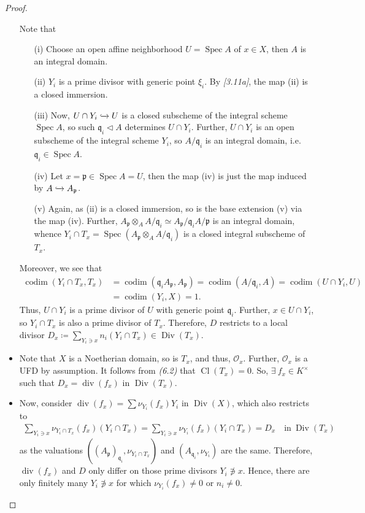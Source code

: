 \documentclass[11pt,a4paper,footinclude=true,headinclude=true]{scrbook} %
\DeclareMathOperator{\Spec}{Spec}
\DeclareMathOperator{\Div}{Div}
\DeclareMathOperator{\Cl}{Cl}
\DeclareMathOperator{\dv}{div}
\DeclareMathOperator{\codim}{codim}
\newcommand{\OO}{\mathcal{O}}
\newcommand{\pp}{\mathfrak{p}}
\newcommand{\qq}{\mathfrak{q}}
\newcommand{\<}{\langle}
\newcommand{\>}{\rangle}
\begin{document}
\begin{proof}
\begin{itemize}
        Note that
        \begin{itemize}
            \item[(i)] Choose an open affine neighborhood $U=\Spec A$ of $x\in X$, then $A$ is an integral domain.
            \item[(ii)] $Y_i$ is a prime divisor with generic point $\xi_i$. By \textit{[3.11a]}, the map (ii) is a closed immersion. 
            \item[(iii)] Now, $U\cap Y_i\xhookrightarrow{}U$ is a closed subscheme of the integral scheme $\Spec A$, so such $\qq_i\triangleleft A$ determines $U\cap Y_i$. Further, $U\cap Y_i$ is an open subscheme of the integral scheme $Y_i$, so $A/\qq_i$ is an integral domain, i.e. $\qq_i\in\Spec A$.
            \item[(iv)] Let $x=\pp\in\Spec A=U$, then the map (iv) is just the map induced by $A\xhookrightarrow{}A_\pp$.
            \item[(v)] Again, as (ii) is a closed immersion, so is the base extension (v) via the map (iv). Further, $A_\pp\otimes_AA/\qq_i\simeq A_\pp/\qq_iA/\pp$ is an integral domain, whence $Y_i\cap T_x=\Spec(A_\pp\otimes_AA/\qq_i)$ is a closed integral subscheme of $T_x$.
        \end{itemize}
        Moreover, we see that
        \begin{align*}
            \codim(Y_i\cap T_x,T_x) &=\codim(\qq_iA_\pp,A_\pp)=\codim(A/\qq_i,A)=\codim(U\cap Y_i,U)\\&=\codim(Y_i,X)=1.
        \end{align*}
        Thus, $U\cap Y_i$ is a prime divisor of $U$ with generic point $\qq_i$. Further, $x\in U\cap Y_i$, so $Y_i\cap T_x$ is also a prime divisor of $T_x$. Therefore, $D$ restricts to a local divisor $D_x\coloneqq\sum_{Y_i\ni x}n_i(Y_i\cap T_x)\in\Div(T_x)$.
        \item Note that $X$ is a Noetherian domain, so is $T_x$, and thus, $\OO_x$. Further, $\OO_x$ is a UFD by assumption. It follows from \textit{(6.2)} that $\Cl(T_x)=0$. So, $\exists\ f_x\in K^\times$ such that $D_x=\dv(f_x)$ in $\Div(T_x)$.
        \item Now, consider $\dv(f_x)=\sum\nu_{Y_i}(f_x)Y_i$ in $\Div(X)$, which also restricts to 
        \begin{align*}
            \sum_{Y_i\ni x}\nu_{Y_i\cap T_x}(f_x)(Y_i\cap T_x)=\sum_{Y_i\ni x}\nu_{Y_i}(f_x)(Y_i\cap T_x)=D_x\quad\text{in}\ \Div(T_x)
        \end{align*}
        as the valuations $((A_\pp)_{\qq_i},\nu_{Y_i\cap T_x})$ and $(A_{\qq_i},\nu_{Y_i})$ are the same. Therefore, $\dv(f_x)$ and $D$ only differ on those prime divisors $Y_i\not\ni x$. Hence, there are only finitely many $Y_i\not\ni x$ for which $\nu_{Y_i}(f_x)\neq0$ or $n_i\neq0$.

\end{itemize}
\end{proof}
\end{document}

